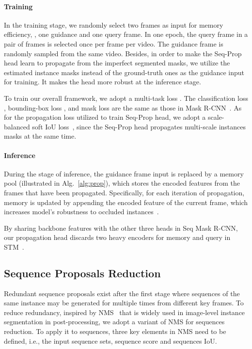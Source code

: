\documentclass[10pt,twocolumn,letterpaper]{article}
\begin{document}
	\vspace{-0.1in}
	
	\paragraph{Training}
	In the training stage, we randomly select two frames as input for memory efficiency, \ie, one guidance and one query frame. 
	In one epoch, the query frame in a pair of frames is selected once per frame per video. The guidance frame is randomly sampled from the same video.
	Besides, in order to make the Seq-Prop head learn to propagate from the imperfect segmented masks, we utilize the estimated instance masks instead of the ground-truth ones as the guidance input for training. It makes the head more robust at the inference stage.
	
	To train our overall framework, we adopt a multi-task loss . The classification loss , bounding-box loss , and mask loss  are the same as those in Mask R-CNN~\cite{he2017mask}. 
	As for the propagation loss  utilized to train Seq-Prop head, we adopt a 
	scale-balanced soft IoU loss~\cite{lin2019agss}, since the Seq-Prop head propagates multi-scale instances masks at the same time.
	
	\vspace{-0.1in}
	
	\paragraph{Inference}
	During the stage of inference, the guidance frame input is replaced by a memory pool (illustrated in Alg.~\ref{alg:prop}), which stores the encoded features from the frames that have been propagated. Specifically, for each iteration of propagation, memory is updated by appending the encoded feature of the current frame, which increases model's robustness to occluded instances~\cite{oh2019video}.
	
	By sharing backbone features with the other three heads in Seq Mask R-CNN, our propagation head discards two heavy encoders for memory and query in STM~\cite{oh2019video}. 
	
	
	\subsection{Sequence Proposals Reduction}\label{Sec:SPR}
	Redundant sequence proposals exist after the first stage where sequences of the same instance may be generated for multiple times from different key frames. To reduce redundancy, inspired by NMS~\cite{girshick2014rich,girshick2015fast,ren2015faster,rothe2014non} that is widely used in image-level instance segmentation in post-processing, we adopt a variant of NMS for sequences reduction. To apply it to sequences, three key elements in NMS need to be defined, i.e., the input sequence sets, sequence score and sequences IoU.
	
\end{document}
